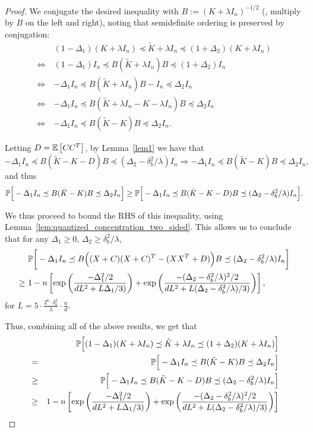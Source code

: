 \documentclass[12pt]{article}
\newcommand{\tK}{\tilde{K}}
\newcommand{\defeq}{:=}
\begin{document}
\begin{proof}
We conjugate the desired inequality with $B \defeq (K + \lambda I_n)^{-1/2}$ (\ie, 
multiply by $B$ on the left and right), noting that semidefinite ordering is
preserved by conjugation:
\begin{align*}
&(1 - \Delta_1) (K + \lambda I_n) \preceq \tK + \lambda I_n \preceq (1 + \Delta_2) (K + \lambda I_n) \\
\iff\ &(1 - \Delta_1) I_n \preceq B (\tK + \lambda I_n) B \preceq (1 + \Delta_2) I_n \\
\iff\ &-\Delta_1 I_n \preceq B (\tK + \lambda I_n) B - I_n \preceq \Delta_2 I_n \\
\iff\ &-\Delta_1 I_n \preceq B (\tK + \lambda I_n - K - \lambda I_n) B \preceq \Delta_2 I_n \\
\iff\ &-\Delta_1 I_n \preceq B (\tK - K) B \preceq \Delta_2 I_n.
\end{align*}

Letting $D=\expect{}{CC^T}$, by Lemma~\ref{lem1} we have that 
$$-\Delta_1 I_n \preceq B (\tK - K - D) B \preceq
(\Delta_2 - \delta^2_b/\lambda) I_n 
\Longrightarrow -\Delta_1 I_n \preceq B (\tK - K) B \preceq
\Delta_2 I_n,$$
and thus
$$\Prob\Big[ -\Delta_1 I_n \preceq B (\tK - K) B \preceq
\Delta_2 I_n \Big] \geq  \Prob\Big[ -\Delta_1 I_n \preceq B (\tK - K - D) B \preceq
(\Delta_2 - \delta^2_b/\lambda) I_n \Big].$$
	
We thus proceed to bound the RHS of this inequality, using 
Lemma~\ref{lem:quantized_concentration_two_sided}.
This allows us to conclude that for any $\Delta_1 \geq 0$, $\Delta_2 \geq \delta_b^2/\lambda$,
\begin{align*}
&\Prob\bigg[- \Delta_1 I_n \preceq B\Big((X + C)(X + C)^T - (XX^T+D)\Big)B \preceq (\Delta_2 - \delta^2_b/\lambda) I_n\bigg] \\
\geq\ &1 - n \left[ \exp \left( \frac{-\Delta_1^2/2}{dL^2 +
	L\Delta_1/3)} \right) + \exp \left(\frac{-(\Delta_2 - \delta^2_b/\lambda)^2/2}{dL^2 + L(\Delta_2 - \delta^2_b/\lambda)/3)} \right)  \right],
\end{align*}
for $L = 5 \cdot \frac{2^b \cdot \delta_b^2}{\lambda}\cdot  \frac{n}{d}$.

Thus, combining all of the above results, we get that
\begin{eqnarray*}
&&\Prob\Big[(1 - \Delta_1) (K + \lambda I_n) \preceq \tK + \lambda I_n \preceq (1 + \Delta_2) (K + \lambda I_n)
\Big] \\
&=& \Prob\Big[ -\Delta_1 I_n \preceq B (\tK - K) B \preceq
\Delta_2 I_n \Big] \\
&\geq& \Prob\Big[ -\Delta_1 I_n \preceq B (\tK - K - D) B \preceq
(\Delta_2 - \delta^2_b/\lambda) I_n \Big]\\
&\geq& 1 - n \left[ \exp \left( \frac{-\Delta_1^2/2}{dL^2 +
	L\Delta_1/3)} \right) + \exp \left(\frac{-(\Delta_2 - \delta^2_b/\lambda)^2/2}{dL^2 + L(\Delta_2 - \delta^2_b/\lambda)/3)} \right)  \right]
\end{eqnarray*}
\end{proof}
\end{document}
